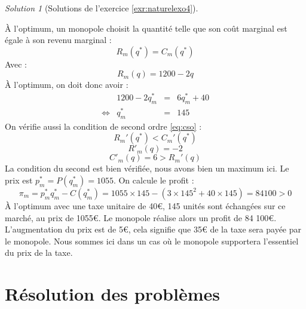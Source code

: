 \documentclass[
]{book}
\theoremstyle{definition}
\theoremstyle{definition}
\theoremstyle{definition}
\theoremstyle{definition}
\theoremstyle{remark}
\newtheorem*{solution}{Solution}
\begin{document}
\begin{solution}[Solutions de l'exercice \ref{exr:naturelexo4}]
\begin{enumerate}
  À l'optimum, un monopole choisit la quantité telle que son coût marginal est égale à son revenu marginal :
  \[R_m(q^*)=C_m(q^*)\]
  Avec :
  \[R_m(q)=1200-2q\]
  À l'optimum, on doit donc avoir :
  \[
  \begin{array}{crcl}
  &1200-2q^*_m&=&6q^*_m+40\\
  \Leftrightarrow & q^*_m&=&145
  \end{array}
  \]
  On vérifie aussi la condition de second ordre \eqref{eq:cso} :
  \[R_m'(q^*)<C_m'(q^*)\]
  \[R'_m(q)=-2\]
  \[C'_m(q)=6>R_m'(q)\]
  La condition du second est bien vérifiée, nous avons bien un maximum ici.
  Le prix est \(p^*_m=P(q^*_m)=1055\).
  On calcule le profit :
  \[\pi_m=p_m^*q_m^*-C(q^*_m)=1055\times145-(3\times145^2+40\times 145)=84100>0\]
  À l'optimum avec une taxe unitaire de 40€, 145 unités sont échangées sur ce marché, au prix de 1055€.
  Le monopole réalise alors un profit de 84 100€.
  L'augmentation du prix est de 5€, cela signifie que 35€ de la taxe sera payée par le monopole.
  Nous sommes ici dans un cas où le monopole supportera l'essentiel du prix de la taxe.
\end{enumerate}

\end{solution}

\hypertarget{appendix-annexes}{%
\appendix}


\hypertarget{ruxe9solution-des-probluxe8mes}{%
\chapter{Résolution des problèmes}\label{ruxe9solution-des-probluxe8mes}}
\end{document}
